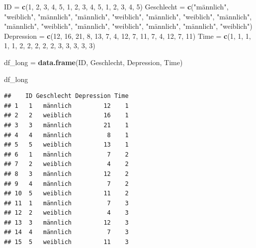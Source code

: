 \documentclass[
]{book}
\newenvironment{Shaded}{\begin{snugshade}}{\end{snugshade}}
\newcommand{\DecValTok}[1]{\textcolor[rgb]{0.00,0.00,0.81}{#1}}
\newcommand{\FunctionTok}[1]{\textcolor[rgb]{0.13,0.29,0.53}{\textbf{#1}}}
\newcommand{\NormalTok}[1]{#1}
\newcommand{\OtherTok}[1]{\textcolor[rgb]{0.56,0.35,0.01}{#1}}
\newcommand{\StringTok}[1]{\textcolor[rgb]{0.31,0.60,0.02}{#1}}
\begin{document}
\begin{Shaded}
\begin{Highlighting}[]
\NormalTok{ID }\OtherTok{=} \FunctionTok{c}\NormalTok{(}\DecValTok{1}\NormalTok{, }\DecValTok{2}\NormalTok{, }\DecValTok{3}\NormalTok{, }\DecValTok{4}\NormalTok{, }\DecValTok{5}\NormalTok{, }
       \DecValTok{1}\NormalTok{, }\DecValTok{2}\NormalTok{, }\DecValTok{3}\NormalTok{, }\DecValTok{4}\NormalTok{, }\DecValTok{5}\NormalTok{, }
       \DecValTok{1}\NormalTok{, }\DecValTok{2}\NormalTok{, }\DecValTok{3}\NormalTok{, }\DecValTok{4}\NormalTok{, }\DecValTok{5}\NormalTok{)}
\NormalTok{Geschlecht }\OtherTok{=} \FunctionTok{c}\NormalTok{(}\StringTok{"männlich"}\NormalTok{, }\StringTok{"weiblich"}\NormalTok{, }\StringTok{"männlich"}\NormalTok{, }\StringTok{"männlich"}\NormalTok{, }\StringTok{"weiblich"}\NormalTok{,}
               \StringTok{"männlich"}\NormalTok{, }\StringTok{"weiblich"}\NormalTok{, }\StringTok{"männlich"}\NormalTok{, }\StringTok{"männlich"}\NormalTok{, }\StringTok{"weiblich"}\NormalTok{,}
               \StringTok{"männlich"}\NormalTok{, }\StringTok{"weiblich"}\NormalTok{, }\StringTok{"männlich"}\NormalTok{, }\StringTok{"männlich"}\NormalTok{, }\StringTok{"weiblich"}\NormalTok{)}
\NormalTok{Depression }\OtherTok{=} \FunctionTok{c}\NormalTok{(}\DecValTok{12}\NormalTok{, }\DecValTok{16}\NormalTok{, }\DecValTok{21}\NormalTok{, }\DecValTok{8}\NormalTok{, }\DecValTok{13}\NormalTok{,}
               \DecValTok{7}\NormalTok{, }\DecValTok{4}\NormalTok{, }\DecValTok{12}\NormalTok{, }\DecValTok{7}\NormalTok{, }\DecValTok{11}\NormalTok{,}
               \DecValTok{7}\NormalTok{, }\DecValTok{4}\NormalTok{, }\DecValTok{12}\NormalTok{, }\DecValTok{7}\NormalTok{, }\DecValTok{11}\NormalTok{)}
\NormalTok{Time }\OtherTok{=} \FunctionTok{c}\NormalTok{(}\DecValTok{1}\NormalTok{, }\DecValTok{1}\NormalTok{, }\DecValTok{1}\NormalTok{, }\DecValTok{1}\NormalTok{, }\DecValTok{1}\NormalTok{,}
         \DecValTok{2}\NormalTok{, }\DecValTok{2}\NormalTok{, }\DecValTok{2}\NormalTok{, }\DecValTok{2}\NormalTok{, }\DecValTok{2}\NormalTok{,}
         \DecValTok{3}\NormalTok{, }\DecValTok{3}\NormalTok{, }\DecValTok{3}\NormalTok{, }\DecValTok{3}\NormalTok{, }\DecValTok{3}\NormalTok{)}

\NormalTok{df\_long }\OtherTok{=} \FunctionTok{data.frame}\NormalTok{(ID, Geschlecht, Depression, Time)}

\NormalTok{df\_long}
\end{Highlighting}
\end{Shaded}

\begin{verbatim}
##    ID Geschlecht Depression Time
## 1   1   männlich         12    1
## 2   2   weiblich         16    1
## 3   3   männlich         21    1
## 4   4   männlich          8    1
## 5   5   weiblich         13    1
## 6   1   männlich          7    2
## 7   2   weiblich          4    2
## 8   3   männlich         12    2
## 9   4   männlich          7    2
## 10  5   weiblich         11    2
## 11  1   männlich          7    3
## 12  2   weiblich          4    3
## 13  3   männlich         12    3
## 14  4   männlich          7    3
## 15  5   weiblich         11    3
\end{verbatim}
\end{document}
